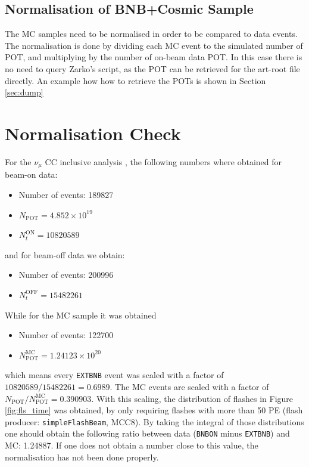 \documentclass[a4paper, oneside, 12pt, onecolumn]{article}
\newcommand{\extbnb}{\texttt{EXTBNB}\xspace}
\newcommand{\bnbon}{\texttt{BNBON}\xspace}
\begin{document}
 


\subsection{Normalisation of BNB+Cosmic Sample}
The MC samples need to be normalised in order to be compared to data events. The normalisation is done by dividing each MC event to the simulated number of POT, and multiplying by the number of on-beam data POT. 
In this case there is no need to query Zarko's script, as the POT can be retrieved for the art-root file directly. An example how how to retrieve the POTs is shown in Section \ref{sec:dump}
  



\section{Normalisation Check}

For the $\nu_\mu$ CC inclusive analysis \cite{ccinc}, the following numbers where obtained for beam-on data: 
\begin{itemize}
\item Number of events: 189827
\item $N_\text{POT} = 4.852 \times 10^{19}$
\item $N_t^\text{ON} = 10820589$
\end{itemize}
and for beam-off data we obtain:
\begin{itemize}
\item Number of events: 200996
\item $ N_t^\text{OFF} = 15482261$
\end{itemize} 

While for the MC sample it was obtained
\begin{itemize}
\item Number of events: 122700
\item $N_\text{POT}^\text{MC} = 1.24123 \times 10^{20}$
\end{itemize}

which means every \extbnb event was scaled with a factor of $10820589/15482261 = 0.6989$. The MC events are scaled with a factor of $N_\text{POT} / N_\text{POT}^\text{MC} = 0.390903$. With this scaling, the distribution of flashes in Figure \ref{fig:fls_time} was obtained, by only requiring flashes with more than 50 PE (flash producer: \texttt{simpleFlashBeam}, MCC8). By taking the integral of those distributions one should obtain the following ratio between data (\bnbon minus \extbnb) and MC: 1.24887. If one does not obtain a number close to this value, the normalisation has not been done properly. 
\end{document}
